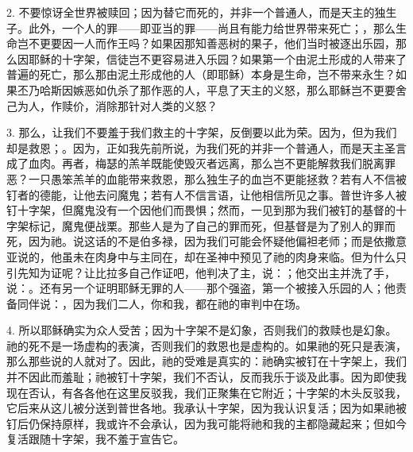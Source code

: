 2. 不要惊讶全世界被赎回；因为替它而死的，并非一个普通人，而是天主的独生子。此外，一个人的罪——即亚当的罪——尚且有能力给世界带来死亡；，那么生命岂不更要因一人而作王吗？如果因那知善恶树的果子，他们当时被逐出乐园，那么因耶稣的十字架，信徒岂不更容易进入乐园？如果第一个由泥土形成的人带来了普遍的死亡，那么那由泥土形成他的人（即耶稣）本身是生命，岂不带来永生？如果丕乃哈斯因嫉恶如仇杀了那作恶的人，平息了天主的义怒，那么耶稣岂不更要舍己为人，作赎价，消除那针对人类的义怒？\par

3. 那么，让我们不要羞于我们救主的十字架，反倒要以此为荣。因为，但为我们却是救恩；。因为，正如我先前所说，为我们死的并非一个普通人，而是天主圣言成了血肉。再者，梅瑟的羔羊既能使毁灭者远离，那么岂不更能解救我们脱离罪恶？一只愚笨羔羊的血能带来救恩，那么独生子的血岂不更能拯救？若有人不信被钉者的德能，让他去问魔鬼；若有人不信言语，让他相信所见之事。普世许多人被钉十字架，但魔鬼没有一个因他们而畏惧；然而，一见到那为我们被钉的基督的十字架标记，魔鬼便战栗。那些人是为了自己的罪而死，但基督是为了别人的罪而死，因为祂。说这话的不是伯多禄，因为我们可能会怀疑他偏袒老师；而是依撒意亚说的，他虽未在肉身中与主同在，却在圣神中预见了祂的肉身来临。但为什么只引先知为证呢？让比拉多自己作证吧，他判决了主，说：；他交出主并洗了手，说：。还有另一个证明耶稣无罪的人——那个强盗，第一个被接入乐园的人；他责备同伴说：，因为我们二人，你和我，都在祂的审判中在场。\par

4. 所以耶稣确实为众人受苦；因为十字架不是幻象，否则我们的救赎也是幻象。祂的死不是一场虚构的表演，否则我们的救恩也是虚构的。如果祂的死只是表演，那么那些说的人就对了。因此，祂的受难是真实的：祂确实被钉在十字架上，我们并不因此而羞耻；祂被钉十字架，我们不否认，反而我乐于谈及此事。因为即使我现在否认，有各各他在这里反驳我，我们正聚集在它附近；十字架的木头反驳我，它后来从这儿被分送到普世各地。我承认十字架，因为我认识复活；因为如果祂被钉后仍保持原样，我或许不会承认，因为我可能将祂和我的主都隐藏起来；但如今复活跟随十字架，我不羞于宣告它。\par

